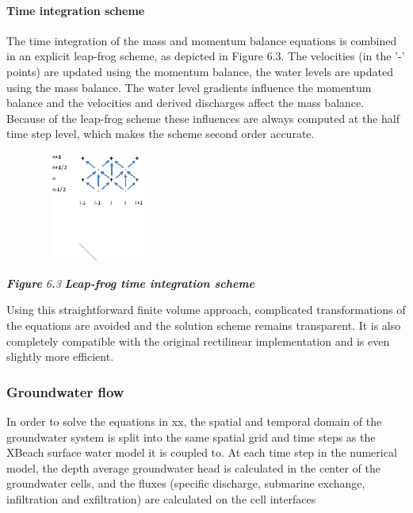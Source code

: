 \documentclass{article}
\begin{document}
\paragraph{ Time integration scheme}

\noindent The time integration of the mass and momentum balance equations is combined in an explicit leap-frog scheme, as depicted in Figure 6.3. The velocities (in the '-' points) are updated using the momentum balance, the water levels are updated using the mass balance. The water level gradients influence the momentum balance and the velocities and derived discharges affect the mass balance. Because of the leap-frog scheme these influences are always computed at the half time step level, which  makes the scheme second order accurate.

\noindent 

\noindent \includegraphics*[width=2.39in, height=1.42in, keepaspectratio=false, trim=0.00in 1.22in 0.00in 0.00in]{image30}

\noindent \textbf{\textit{Figure }}\textit{6}\textbf{\textit{.}}\textit{3}\textbf{\textit{ Leap-frog time integration scheme}}

\noindent Using this straightforward finite volume approach, complicated transformations of the equations are avoided and the solution scheme remains transparent. It is also completely compatible with the original rectilinear implementation and is even slightly more efficient.

\noindent 


\subsubsection{ Groundwater flow}

\noindent In order to solve the equations in xx, the spatial and temporal domain of the groundwater system is split into the same spatial grid and time steps as the XBeach surface water model it is coupled to. At each time step in the numerical model, the depth average groundwater head is calculated in the center of the groundwater cells, and the fluxes (specific discharge, submarine exchange, infiltration and exfiltration) are calculated on the cell interfaces
\end{document}
